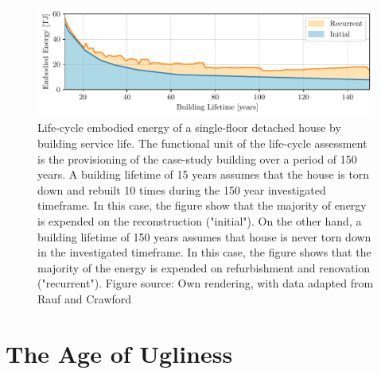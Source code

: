 \documentclass{article}
\begin{document}
\begin{figure}[ht!]
    \includegraphics[width=\textwidth]{./figures/building_embodied_energy.pdf}
    \vspace{-5mm}
    \caption{
        Life-cycle embodied energy of a single-floor detached house by building service life. The functional unit of the life-cycle assessment is the provisioning of the case-study building over a period of 150 years. A building lifetime of 15 years assumes that the house is torn down and rebuilt 10 times during the 150 year investigated timeframe. In this case, the figure show that the majority of energy is expended on the reconstruction ("initial"). On the other hand, a building lifetime of 150 years assumes that house is never torn down in the investigated timeframe. In this case, the figure shows that the majority of the energy is expended on refurbishment and renovation ("recurrent").
        \newline Figure source: Own rendering, with data adapted from Rauf and Crawford \cite[Figure 5]{rauf_building_2015}
    }
    \label{fig:energy}
\end{figure}

\clearpage
\section{The Age of Ugliness}
\label{sec:ugliness}
\end{document}
